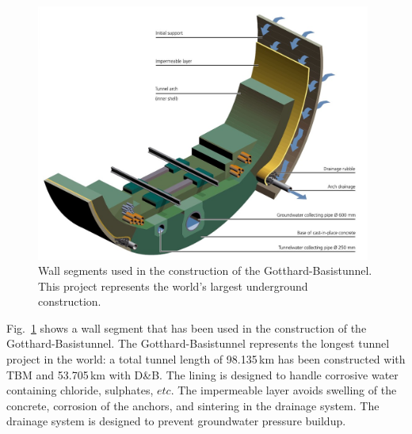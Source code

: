 \begin{figure}[htbp!]
\centering
\includegraphics[width=11cm]{./Sec_SiteInfra/Figures/tunnelwall.jpg}
\caption{Wall segments used in the construction of the Gotthard-Basistunnel.
This project represents the world's largest underground construction.}
\label{fig:tunnelwall}
\end{figure}
Fig.~\ref{fig:tunnelwall} shows a wall segment that has been used in
the construction of the Gotthard-Basistunnel. The Gotthard-Basistunnel
represents the longest tunnel project in the world: a total tunnel length
of 98.135\,km has been constructed with TBM and 53.705\,km with D\&B. 
The lining is designed to handle corrosive water containing chloride,
sulphates, $etc.$ The impermeable layer avoids swelling of the concrete,
corrosion of the anchors, and sintering in the drainage system.
The drainage system is designed to prevent groundwater pressure buildup.

